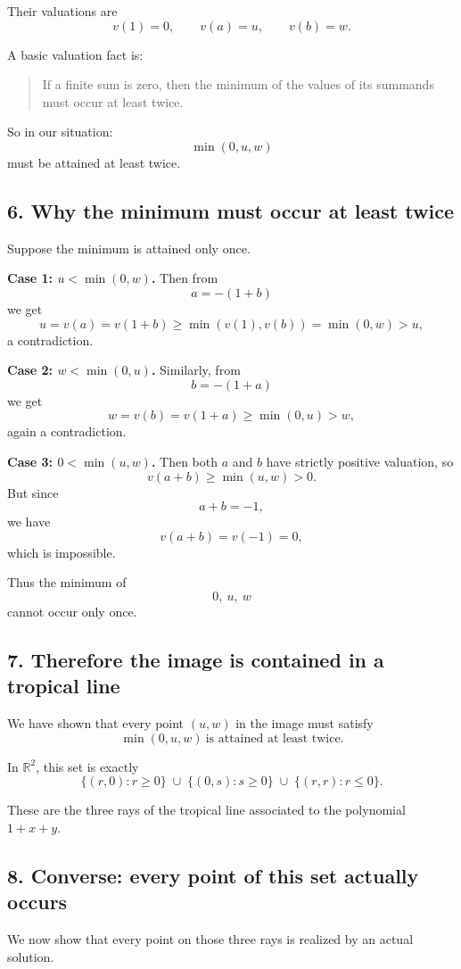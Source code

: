 \documentclass[12pt,a4paper]{article}
\theoremstyle{notespace}
\begin{document}
Their valuations are
\[
v(1)=0,
\qquad
v(a)=u,
\qquad
v(b)=w.
\]

A basic valuation fact is:

\begin{quote}
	If a finite sum is zero, then the minimum of the values of its summands must occur at least twice.
\end{quote}

So in our situation:
\[
\min(0,u,w)
\]
must be attained at least twice.

\subsection{6. Why the minimum must occur at least twice}

Suppose the minimum is attained only once.

\textbf{Case 1: \(u<\min(0,w)\).}
Then from
\[
a=-(1+b)
\]
we get
\[
u=v(a)=v(1+b)\ge \min(v(1),v(b))=\min(0,w)>u,
\]
a contradiction.

\textbf{Case 2: \(w<\min(0,u)\).}
Similarly, from
\[
b=-(1+a)
\]
we get
\[
w=v(b)=v(1+a)\ge \min(0,u)>w,
\]
again a contradiction.

\textbf{Case 3: \(0<\min(u,w)\).}
Then both \(a\) and \(b\) have strictly positive valuation, so
\[
v(a+b)\ge \min(u,w)>0.
\]
But since
\[
a+b=-1,
\]
we have
\[
v(a+b)=v(-1)=0,
\]
which is impossible.

Thus the minimum of
\[
0,\ u,\ w
\]
cannot occur only once.

\subsection{7. Therefore the image is contained in a tropical line}

We have shown that every point \((u,w)\) in the image must satisfy
\[
\min(0,u,w)\ \text{is attained at least twice}.
\]

In \(\mathbb R^2\), this set is exactly
\[
\{(r,0): r\ge 0\}
\;\cup\;
\{(0,s): s\ge 0\}
\;\cup\;
\{(r,r): r\le 0\}.
\]

These are the three rays of the tropical line associated to the polynomial \(1+x+y\).

\subsection{8. Converse: every point of this set actually occurs}

We now show that every point on those three rays is realized by an actual solution.
\end{document}
